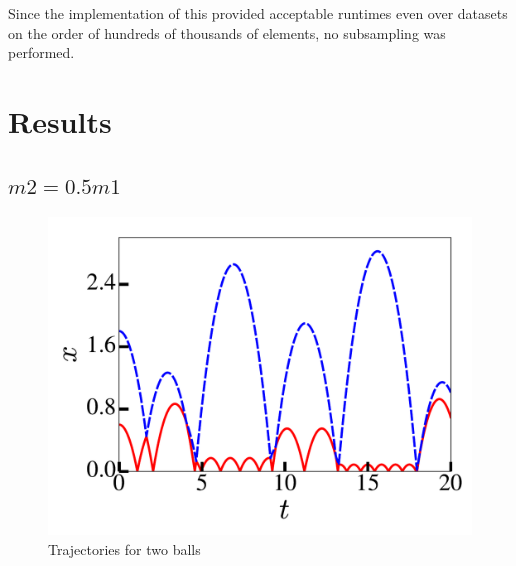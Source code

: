 \documentclass[pra,twocolumn,showpacs,amsmath,amssymb, aps, 10pt]{revtex4-1}
\begin{document}
Since the implementation of this provided acceptable runtimes even over datasets
on the order of hundreds of thousands of elements, no subsampling was performed.


%






\section{Results} \label{sec:results}



\subsection{$m2 = 0.5 m1$}
\begin{figure}
  \includegraphics[width=0.8\linewidth]{r2_0_traj}
  \caption{Trajectories for two balls}
  \label{fig:0.5-traj}
\end{figure}
\end{document}
